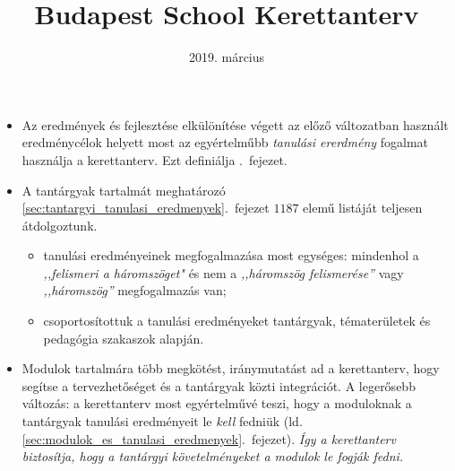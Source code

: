 \documentclass[magyar,12pt,a4paper,oneside,draf]{report}
\begin{document}
\newif\ifkerettanterv
\kerettantervtrue

\title{Budapest School Kerettanterv}
\author{}
\date{2019. m\'arcius}
\maketitle

\tableofcontents
\newpage
\begin{itemize}
    \item  Az eredmények és fejlesztése elkülönítése végett az előző
          változatban használt
          eredménycélok helyett most az egyértelműbb \emph{tanulási ererdmény}
          fogalmat
          használja a kerettanterv. Ezt definiálja
          .~fejezet.

    \item A tantárgyak tartalmát meghatározó
          \ref{sec:tantargyi_tanulasi_eredmenyek}.~fejezet $1187$ elemű
          listáját teljesen
          átdolgoztunk.
          \begin{itemize}
              \item tanulási eredményeinek megfogalmazása most egységes:
                    mindenhol a
                    \emph{,,felismeri a háromszöget"}
                    és nem a \emph{,,háromszög felismerése''} vagy
                    \emph{,,háromszög''}
                    megfogalmazás van;
              \item csoportosítottuk a tanulási eredményeket tantárgyak,
                    tématerületek és
                    pedagógia szakaszok alapján.
          \end{itemize}

    \item Modulok tartalmára több megkötést, iránymutatást ad a kerettanterv,
          hogy
          segítse a tervezhetőséget és a tantárgyak
          közti integrációt. A legerősebb változás: a kerettanterv most
          egyértelművé teszi, hogy a moduloknak a tantárgyak tanulási
          eredményeit le \emph{kell} fedniük (ld.
          \ref{sec:modulok_es_tanulasi_eredmenyek}.~fejezet).
          \emph{Így a kerettanterv biztosítja, hogy a tantárgyi követelményeket
              a modulok le fogják fedni.}


\end{itemize}
\end{document}
